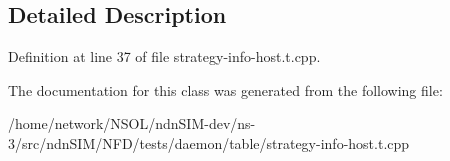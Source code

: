 \subsection{Detailed Description}


Definition at line 37 of file strategy-\/info-\/host.\+t.\+cpp.



The documentation for this class was generated from the following file\+:\begin{DoxyCompactItemize}
\item 
/home/network/\+N\+S\+O\+L/ndn\+S\+I\+M-\/dev/ns-\/3/src/ndn\+S\+I\+M/\+N\+F\+D/tests/daemon/table/strategy-\/info-\/host.\+t.\+cpp\end{DoxyCompactItemize}
